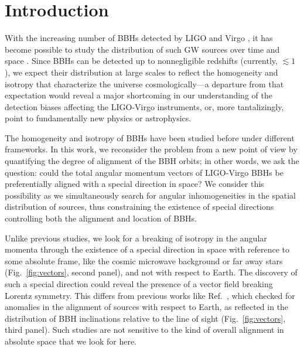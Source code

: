 \documentclass[aps,prd,twocolumn,superscriptaddress,preprintnumbers,floatfix,nofootinbib]{revtex4-2}
\newcommand*{\mi}[1]{{\color{magenta} [{\bf MAX}: #1]}}
\begin{document}
\section{Introduction}
\label{sec:intro}

With the increasing number of \acp{BBH} detected by LIGO \cite{TheLIGOScientific:2014jea} and Virgo \cite{TheVirgo:2014hva}, it has become possible to study the distribution of such \ac{GW} sources over time and space \cite{LIGOScientific:2021psn,Fishbach:2018edt,Fishbach:2021yvy,Stiskalek:2020wbj,Payne:2020pmc,Cavaglia:2020fnc,Essick:2022slj}.
Since \acp{BBH} can be detected up to nonnegligible redshifts (currently, $\lesssim 1$), we expect their distribution at large scales to reflect the homogeneity and isotropy that characterize the universe cosmologically---a departure from that expectation would reveal a major shortcoming in our understanding of the detection biases affecting the LIGO-Virgo instruments, or, more tantalizingly, point to fundamentally new physics or astrophysics.

The homogeneity \cite{Stiskalek:2020wbj,Payne:2020pmc,Cavaglia:2020fnc,Essick:2022slj} and isotropy \cite{Vitale:2022pmu} of \acp{BBH} have been studied before under different frameworks.
In this work, we reconsider the problem from a new point of view by quantifying the degree of alignment of the \ac{BBH} orbits; in other words, we ask the question: could the total angular momentum vectors of LIGO-Virgo \acp{BBH} be preferentially aligned with a special direction in space?
We consider this possibility as we simultaneously search for angular inhomogeneities in the spatial distribution of sources, thus constraining the existence of special directions controlling both the alignment and location of \acp{BBH}.

Unlike previous studies, we look for a breaking of isotropy in the angular momenta through the existence of a special direction in space with reference to some absolute frame, like the cosmic microwave background or far away stars (Fig.~\ref{fig:vectors}, second panel), and not with respect to Earth.
The discovery of such a special direction could reveal the presence of a vector field breaking Lorentz symmetry.
This differs from previous works like Ref.~\cite{Vitale:2022pmu}, which checked for anomalies in the alignment of sources with respect to Earth, as reflected in the distribution of \ac{BBH} inclinations relative to the line of sight (Fig.~\ref{fig:vectors}, third panel).
Such studies are not sensitive to the kind of overall alignment in absolute space that we look for here.
\end{document}
